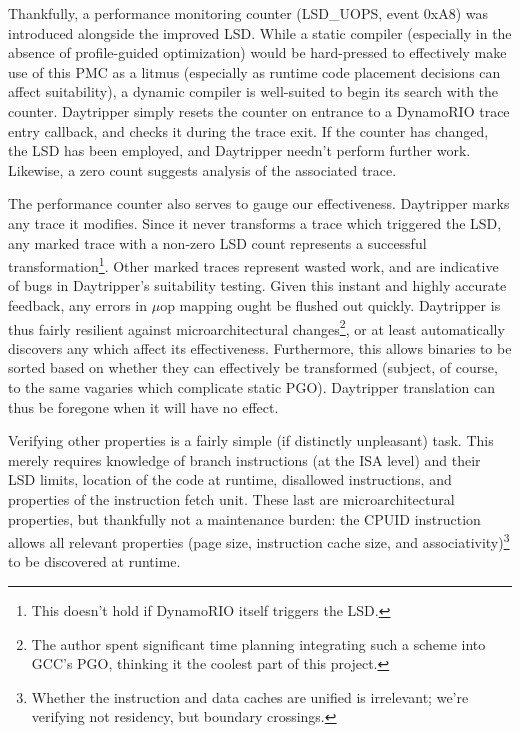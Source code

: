 \documentclass[]{sigplanconf}
\begin{document}
Thankfully, a performance monitoring counter (LSD\_UOPS, event 0xA8) was
introduced alongside the improved LSD. While a static compiler (especially in
the absence of profile-guided optimization) would be hard-pressed to
effectively make use of this PMC as a litmus (especially as runtime code
placement decisions can affect suitability), a dynamic compiler is well-suited
to begin its search with the counter. Daytripper simply resets the counter on
entrance to a DynamoRIO trace entry callback, and checks it during the trace
exit. If the counter has changed, the LSD has been employed, and Daytripper
needn't perform further work. Likewise, a zero count suggests analysis of the
associated trace.

The performance counter also serves to gauge our effectiveness. Daytripper
marks any trace it modifies. Since it never transforms a trace which triggered
the LSD, any marked trace with a non-zero LSD count represents a successful
transformation\footnote{This doesn't hold if DynamoRIO itself triggers the LSD.}. Other marked traces represent wasted work, and are indicative
of bugs in Daytripper's suitability testing. Given this instant and highly
accurate feedback, any errors in $\mu$op mapping ought be flushed out quickly.
Daytripper is thus fairly resilient against microarchitectural changes\footnote{The
author spent significant time planning integrating such a scheme into GCC's PGO, thinking
it the coolest part of this project.}, or at least automatically discovers any
which affect its effectiveness. Furthermore, this allows binaries to be
sorted based on whether they can effectively be transformed (subject, of course,
to the same vagaries which complicate static PGO). Daytripper translation can
thus be foregone when it will have no effect.

Verifying other properties is a fairly simple (if distinctly unpleasant) task.
This merely requires knowledge of branch instructions (at the ISA level) and
their LSD limits, location of the code at runtime, disallowed instructions,
and properties of the instruction fetch unit. These last are microarchitectural
properties, but thankfully not a maintenance burden: the CPUID instruction
allows all relevant properties (page size, instruction cache size, and
associativity)\footnote{Whether the instruction and data caches are unified is irrelevant;
we're verifying not residency, but boundary crossings.} to be discovered
at runtime.
\end{document}
